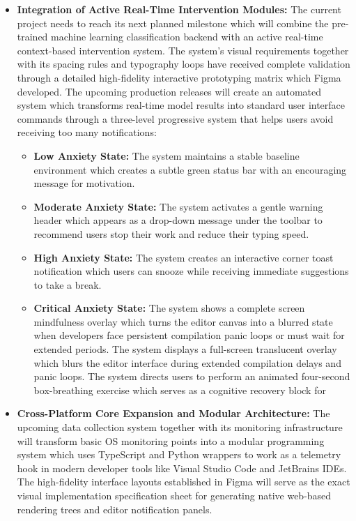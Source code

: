 \begin{itemize}
    \item \textbf{Integration of Active Real-Time Intervention Modules:} The current project needs to reach its next planned milestone which will combine the pre-trained machine learning classification backend with an active real-time context-based intervention system. The system's visual requirements together with its spacing rules and typography loops have received complete validation through a detailed high-fidelity interactive prototyping matrix which Figma developed. The upcoming production releases will create an automated system which transforms real-time model results into standard user interface commands through a three-level progressive system that helps users avoid receiving too many notifications:
    \begin{itemize}
        \item \textbf{Low Anxiety State:} The system maintains a stable baseline environment which creates a subtle green status bar with an encouraging message for motivation.
        \item \textbf{Moderate Anxiety State:} The system activates a gentle warning header which appears as a drop-down message under the toolbar to recommend users stop their work and reduce their typing speed.
        \item \textbf{High Anxiety State:} The system creates an interactive corner toast notification which users can snooze while receiving immediate suggestions to take a break.
        \item \textbf{Critical Anxiety State:} The system shows a complete screen mindfulness overlay which turns the editor canvas into a blurred state when developers face persistent compilation panic loops or must wait for extended periods. The system displays a full-screen translucent overlay which blurs the editor interface during extended compilation delays and panic loops. The system directs users to perform an animated four-second box-breathing exercise which serves as a cognitive recovery block for
    \end{itemize}

    \item \textbf{Cross-Platform Core Expansion and Modular Architecture:} The upcoming data collection system together with its monitoring infrastructure will transform basic OS monitoring points into a modular programming system which uses TypeScript and Python wrappers to work as a telemetry hook in modern developer tools like Visual Studio Code and JetBrains IDEs. The high-fidelity interface layouts established in Figma will serve as the exact visual implementation specification sheet for generating native web-based rendering trees and editor notification panels.


\end{itemize}
